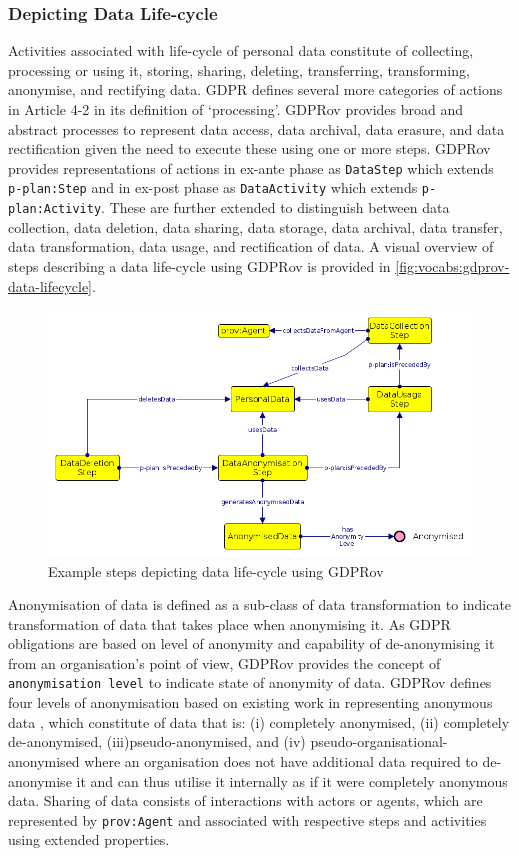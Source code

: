 \subsubsection{Depicting Data Life-cycle}
Activities associated with life-cycle of personal data constitute of collecting, processing or using it, storing, sharing, deleting, transferring, transforming, anonymise, and rectifying data. GDPR defines several more categories of actions in Article 4-2 in its definition of `processing'.
GDPRov provides broad and abstract processes to represent data access, data archival, data erasure, and data rectification given the need to execute these using one or more steps.
GDPRov provides representations of actions in ex-ante phase as \texttt{DataStep} which extends \texttt{p-plan:Step} and in ex-post phase as \texttt{DataActivity} which extends \texttt{p-plan:Activity}.
These are further extended to distinguish between data collection, data deletion, data sharing, data storage, data archival, data transfer, data transformation, data usage, and rectification of data.
A visual overview of steps describing a data life-cycle using GDPRov is provided in \autoref{fig:vocabs:gdprov-data-lifecycle}.
\begin{figure}[htbp]
    \centering
    \includegraphics[width=\linewidth]{img/GDPRov_data_lifecycle.png}
    \caption{Example steps depicting data life-cycle using GDPRov}
    \label{fig:vocabs:gdprov-data-lifecycle}
\end{figure}

Anonymisation of data is defined as a sub-class of data transformation to indicate transformation of data that takes place when anonymising it.
As GDPR obligations are based on level of anonymity and capability of de-anonymising it from an organisation's point of view, GDPRov provides the concept of \texttt{anonymisation level} to indicate state of anonymity of data.
GDPRov defines four levels of anonymisation based on existing work in representing anonymous data \cite{hintze_meeting_2017}, which constitute of data that is: (i) completely anonymised, (ii) completely de-anonymised, (iii)pseudo-anonymised, and (iv) pseudo-organisational-anonymised where an organisation does not have additional data required to de-anonymise it and can thus utilise it internally as if it were completely anonymous data.
Sharing of data consists of interactions with actors or agents, which are represented by \texttt{prov:Agent} and associated with respective steps and activities using extended properties.

